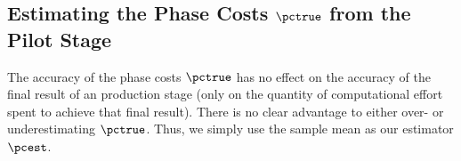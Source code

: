 \subsection{Estimating the Phase Costs $\pctrue$ from the Pilot Stage}
\label{sec:pc_estimation}
The accuracy of the phase costs $\pctrue$ has no effect on the accuracy of the final result of an  production stage (only on the quantity of computational effort spent to achieve that final result). There is no clear advantage to either over- or underestimating $\pctrue$. Thus, we simply use the sample mean as our estimator $\pcest$.

\clearpage

%

